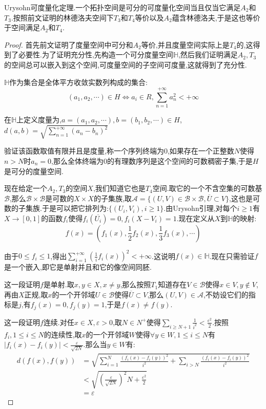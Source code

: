 Urysohn可度量化定理.一个拓扑空间是可分的可度量化空间当且仅当它满足$A_2$和$T_3$.按照前文证明的林德洛夫空间下$T_3$和$T_4$等价以及$A_2$蕴含林德洛夫,于是这也等价于空间满足$A_2$和$T_4$.
\begin{proof}

首先前文证明了度量空间中可分和$A_2$等价,并且度量空间实际上是$T_4$的,这得到了必要性.为了证明充分性,先构造一个可分度量空间$\mathbb{H}$,然后我们证明满足$A_2,T_3$的空间总可以嵌入到这个空间,可度量空间的子空间可度量,这就得到了充分性.

$\mathbb{H}$作为集合是全体平方收敛实数列构成的集合:
$$(a_1,a_2,\cdots)\in H\Leftrightarrow a_i\in R,\sum_{n=1}^{+\infty}a_n^2<+\infty$$

在$\mathbb{H}$上定义度量为,$a=(a_1,a_2,\cdots),b=(b_1,b_2,\cdots)\in H$,$d(a,b)=\sqrt{\sum_{n=1}^{+\infty}\left(a_n-b_n\right)^2}$

验证该函数取值有限并且是度量,称一个序列终端为0,如果存在一个正整数$N$使得$n>N$时$a_n=0$,那么全体终端为0的有理数序列是这个空间的可数稠密子集,于是$H$是可分的度量空间.

现在给定一个$A_2,T_3$的空间$X$,我们知道它也是$T_4$空间.取它的一个不含空集的可数基$\mathscr{B}$,那么$\mathscr{B}\times\mathscr{B}$是可数的$X\times X$的子集族,取$\mathscr{A}=\{(U,V)\in\mathscr{B}\times\mathscr{B},\overline{U}\subset V\}$,这也是可数的子集族.于是可以把它排列为:$\{(U_i,V_i),i\ge1\}$.由Urysohn引理,对每个$i\ge1$有$X\to[0,1]$的函数$f_i$使得$f_i(\overline{U_i})=0,f_i(X-V_i)=1$.现在定义从$X$到$\mathbb{H}$的映射:
$$f(x)=\left(f_1(x),\frac{1}{2}f_2(x),\frac{1}{3}f_3(x),\cdots\right)$$

由于$0\le f_i\le1$,得出$\sum_ {i=1}^{+\infty}\left(\frac{1}{i}f_i(x)\right)^2<+\infty$.这说明$f(x)\in\mathbb{H}$.现在只需验证$f$是一个嵌入,即它是单射并且和它的像空间同胚.

这一段证明$f$是单射.取$x,y\in X,x\not=y$,那么按照$T_1$知道存在$V\in\mathscr{B}$使得$x\in V,y\not\in V$,再由$X$正规,取$x$的一个开邻域$U\in\mathscr{B}$使得$\overline{U}\subset V$,那么$(U,V)\in\mathscr{A}$,不妨设它们的指标是$j$,有$f_j(x)=0,f_j(y)=1$,于是$f(x)\not=f(y)$.

这一段证明$f$连续.对任$x\in X,\varepsilon>0$,取$N\in N^+$使得$\sum_ {i\ge N+1}\frac{1}{i^2}<\frac{\varepsilon^2}{2}$.按照$f_i,1\le i\le N$的连续性,取$x$的一个开邻域$W$使得$\forall y\in W,1\le i\le N$有$|f_i(x)-f_i(y)|<\frac{\varepsilon}{\sqrt{2N}}$.那么当$y\in W$有:
\begin{align*}
d(f(x),f(y))&=\sqrt{\sum_{i=1}^N\frac{(f_i(x)-f_i(y))^2}{i^2}+\sum_{i>N}\frac{(f_i(x)-f_i(y))^2}{i^2}}\\
&<\sqrt{\left(\frac{\varepsilon}{\sqrt{2N}}\right)^2N+\frac{\varepsilon^2}{2}}\\
&=\varepsilon
\end{align*}


\end{proof}
